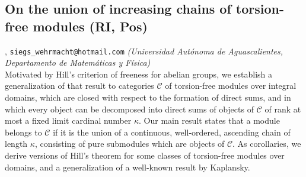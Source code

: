 \subsection{\sffamily On the union of increasing chains of torsion-free modules {\footnotesize (RI, Pos)}} \label{reg-247} 
, {\tt siegs\_wehrmacht@hotmail.com}  {\slshape (Universidad Aut\'onoma de Aguascalientes, Departamento de Matem\'aticas y F\'isica)}\\
          \noindent Motivated by Hill's criterion of freeness for abelian groups, we establish a generalization of that result to categories $\mathcal {C}$ of torsion-free modules over integral domains, which are closed with respect to the formation of direct sums, and in which every object can be decomposed into direct sums of objects of $\mathcal {C}$ of rank at most a fixed limit cardinal number $\kappa$. Our main result states that a module belongs to $\mathcal {C}$ if it is the union of a continuous, well-ordered, ascending chain of length $\kappa$, consisting of pure submodules which are objects of $\mathcal {C}$. As corollaries, we derive versions of Hill's theorem for some classes of torsion-free modules over domains, and a generalization of a well-known result by Kaplansky.

